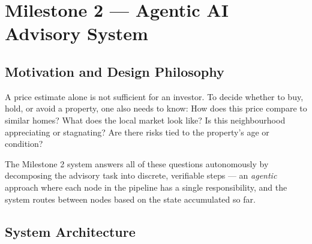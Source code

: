 \documentclass[12pt, a4paper]{article}
\begin{document}
\section{Milestone 2 --- Agentic AI Advisory System}

\subsection{Motivation and Design Philosophy}

A price estimate alone is not sufficient for an investor. To decide whether to buy,
hold, or avoid a property, one also needs to know: How does this price compare to
similar homes? What does the local market look like? Is this neighbourhood
appreciating or stagnating? Are there risks tied to the property's age or condition?

The Milestone 2 system answers all of these questions autonomously by decomposing
the advisory task into discrete, verifiable steps --- an \textit{agentic} approach
where each node in the pipeline has a single responsibility, and the system routes
between nodes based on the state accumulated so far.

\subsection{System Architecture}
\end{document}
